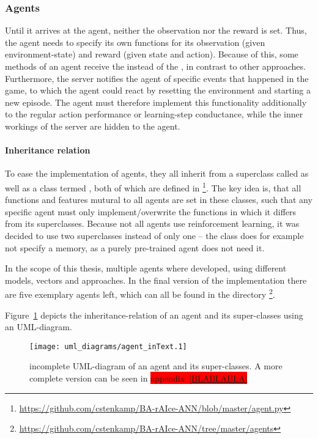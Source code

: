 \subsubsection{Agents}

Until it arrives at the agent, neither the observation nor the reward is set. Thus, the agent needs to specify its own functions for its observation (given environment-state) and reward (given state and action). Because of this, some methods of an agent receive the  instead of the , in contrast to other approaches. Furthermore, the server notifies the agent of specific events that happened in the game, to which the agent could react by resetting the environment and starting a new episode. The agent must therefore implement this functionality additionally to the regular action performance or learning-step conductance, while the inner workings of the server are hidden to the agent. 

\paragraph{Inheritance relation}

To ease the implementation of agents, they all inherit from a superclass called  as well as a class termed , both of which are defined in \footnote{\url{https://github.com/cstenkamp/BA-rAIce-ANN/blob/master/agent.py}}. The key idea is, that all functions and features mutural to all agents are set in these classes, such that any specific agent must only implement/overwrite the functions in which it differs from its superclasses. Because not all agents use reinforcement learning, it was decided to use two superclasses instead of only one -- the class  does for example not specify a memory, as a purely pre-trained agent does not need it.

In the scope of this thesis, multiple agents where developed, using different models, vectors and approaches. In the final version of the implementation there are five exemplary agents left, which can all be found in the directory \footnote{\url{https://github.com/cstenkamp/BA-rAIce-ANN/tree/master/agents}}. 

Figure~\ref{fig:agentMINI} depicts the inheritance-relation of an agent and its super-classes using an UML-diagram.
\begin{figure}[h!]
	\centering 
	\texttt{[image: uml\_diagrams/agent\_inText.1]}  
	\caption[UML-diagram of an agent and its super-classes]{incomplete UML-diagram of an agent and its super-classes. A more complete version can be seen in \colorbox{red}{appendix~\ref{BLABLABLA}}}
	\label{fig:agentMINI}
\end{figure}

